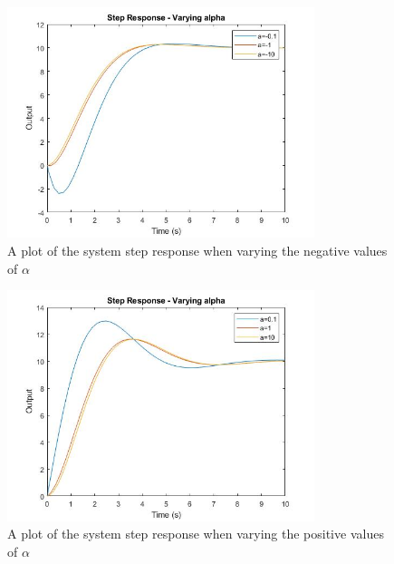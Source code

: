 \begin{figure}[H]
              \centering
              \includegraphics[width=0.8\textwidth]{./figures/lab4_fig4-part4-3-2-negative.jpg}
              \caption{A plot of the system step response when varying the negative values of $\alpha$}
              \label{fig:varying-negative-alpha}
\end{figure}

\begin{figure}[H]
              \centering
              \includegraphics[width=0.8\textwidth]{./figures/lab4_fig3-part4-3-2-positive.jpg}
              \caption{A plot of the system step response when varying the positive values of $\alpha$}
              \label{fig:varying-positive-alpha}
\end{figure}


